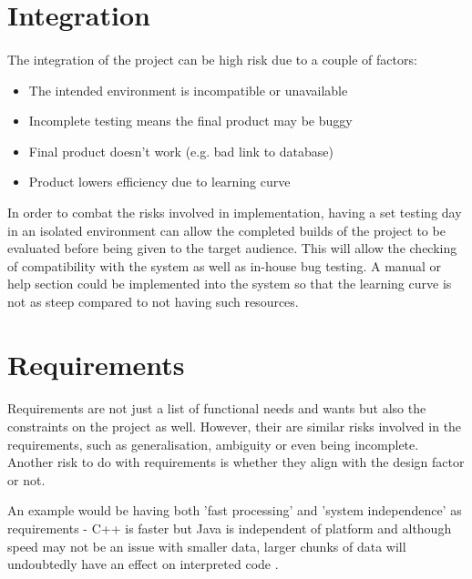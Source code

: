 \section{Integration}
\paragraph{}

The integration of the project can be high risk due to a couple of factors:

\begin{itemize}
    \item The intended environment is incompatible or unavailable
    \item Incomplete testing means the final product may be buggy
    \item Final product doesn't work (e.g. bad link to database)
    \item Product lowers efficiency due to learning curve \cite{RiskList}
\end{itemize}

In order to combat the risks involved in implementation, having a set testing
day in an isolated environment can allow the completed builds of the project to
be evaluated before being given to the target audience.  This will allow the
checking of compatibility with the system as well as in-house bug testing.  A
manual or help section could be implemented into the system so that the learning
curve is not as steep compared to not having such resources.

\section{Requirements}
\paragraph{}

Requirements are not just a list of functional needs and wants but also the
constraints on the project as well.  However, their are similar risks involved
in the requirements, such as generalisation, ambiguity or even being incomplete.
Another risk to do with requirements is whether they align with the design
factor or not.

An example would be having both 'fast processing' and 'system
independence' as requirements - C++ is faster but Java is independent of
platform and although speed may not be an issue with smaller data, larger chunks
of data will undoubtedly have an effect on interpreted code
\cite{javaCbenchmark}.

